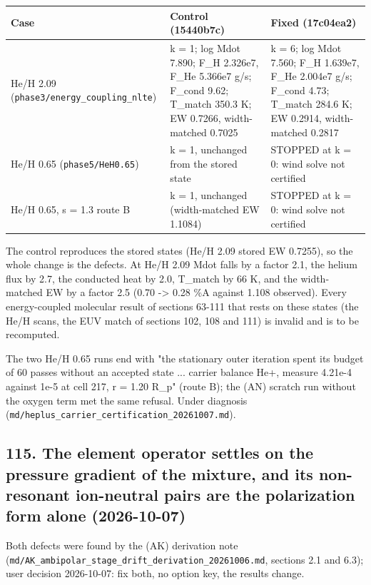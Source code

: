 \documentclass[english,a4paper]{my_memo}
\begin{document}
{\def\LTcaptype{none} %
{\small
\begin{longtable}[]{@{}lll@{}}
\toprule\noalign{}
Case & Control (15440b7c) & Fixed (17c04ea2) \\
\midrule\noalign{}
\endhead
\bottomrule\noalign{}
\endlastfoot
He/H 2.09 (\texttt{phase3/energy\_coupling\_nlte}) & k = 1; log Mdot 7.890; F\_H 2.326e7, F\_He 5.366e7 g/s; F\_cond 9.62; T\_match 350.3 K; EW 0.7266, width-matched 0.7025 & k = 6; log Mdot 7.560; F\_H 1.639e7, F\_He 2.004e7 g/s; F\_cond 4.73; T\_match 284.6 K; EW 0.2914, width-matched 0.2817 \\
He/H 0.65 (\texttt{phase5/HeH0.65}) & k = 1, unchanged from the stored state & STOPPED at k = 0: wind solve not certified \\
He/H 0.65, s = 1.3 route B & k = 1, unchanged (width-matched EW 1.1084) & STOPPED at k = 0: wind solve not certified \\
\end{longtable}
}
}

The control reproduces the stored states (He/H 2.09 stored EW 0.7255), so
the whole change is the defect\textquotesingle s. At He/H 2.09 Mdot falls by a factor 2.1,
the helium flux by 2.7, the conducted heat by 2.0, T\_match by 66 K, and the
width-matched EW by a factor 2.5 (0.70 -\textgreater{} 0.28 \%A against 1.108 observed).
Every energy-coupled molecular result of sections 63-111 that rests on
these states (the He/H scans, the EUV match of sections 102, 108 and 111)
is invalid and is to be recomputed.

The two He/H 0.65 runs end with "the stationary outer iteration spent its
budget of 60 passes without an accepted state ... carrier balance He+,
measure 4.21e-4 against 1e-5 at cell 217, r = 1.20 R\_p" (route B); the (AN)
scratch run without the oxygen term met the same refusal. Under diagnosis
(\texttt{md/heplus\_carrier\_certification\_20261007.md}).

\subsection{115. The element operator settles on the pressure gradient of the mixture, and its non-resonant ion-neutral pairs are the polarization form alone (2026-10-07)}\label{115-the-element-operator-settles-on-the-pressure-gradient-of-the-mixture-and-its-non-resonant-ion-neutral-pairs-are-the-polarization-form-alone-2026-10-07}

Both defects were found by the (AK) derivation note
(\texttt{md/AK\_ambipolar\_stage\_drift\_derivation\_20261006.md}, sections 2.1 and 6.3);
user decision 2026-10-07: fix both, no option key, the results change.
\end{document}
